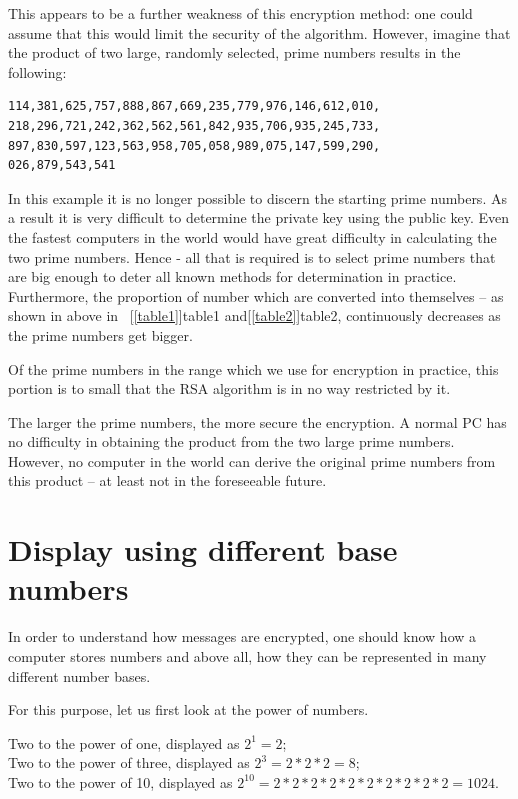 \documentclass[a4paper,11pt,oneside,openright,titlepage]{scrbook}
\begin{document}
\clearpage
This appears to be a further weakness of this encryption method: one
could assume that this would limit the security of the algorithm.
However, imagine that the product of two large, randomly selected,
prime numbers results in the following:

\begin{verbatim}
114,381,625,757,888,867,669,235,779,976,146,612,010,
218,296,721,242,362,562,561,842,935,706,935,245,733,
897,830,597,123,563,958,705,058,989,075,147,599,290,
026,879,543,541
\end{verbatim}

In this example it is no longer possible to discern the starting prime
numbers. As a result it is very difficult to determine the private key
using the public key. Even the fastest computers in the world would
have great difficulty in calculating the two prime numbers.  Hence -
all that is required is to select prime numbers that are big enough to
deter all known methods for determination in practice. Furthermore,
the proportion of number which are converted into themselves -- as
shown in above in  ~[\ref{table1}]{table1}
and[\ref{table2}]{table2}, continuously decreases as the
prime numbers get bigger.

Of the prime numbers in the range which we use for encryption in
practice, this portion is to small that the RSA algorithm is in no way
restricted by it.

The larger the prime numbers, the more secure the encryption. A normal
PC has no difficulty in obtaining the product from the two large prime
numbers. However, no computer in the world can derive the original
prime numbers from this product -- at least not in the foreseeable
future.


\clearpage
\section{Display using different base numbers}

In order to understand how messages are encrypted, one should know how
a computer stores numbers and above all, how they can be represented
in many different number bases.

For this purpose, let us first look at the power of numbers.

Two to the power of one, displayed as $2^1 = 2$; \\
Two to the power of three, displayed as $2^3 = 2 * 2 * 2 = 8$;\\
Two to the power of 10, displayed as $2^{10} = 2*2*2*2*2*2*2*2*2*2 = 1024$.
\end{document}
